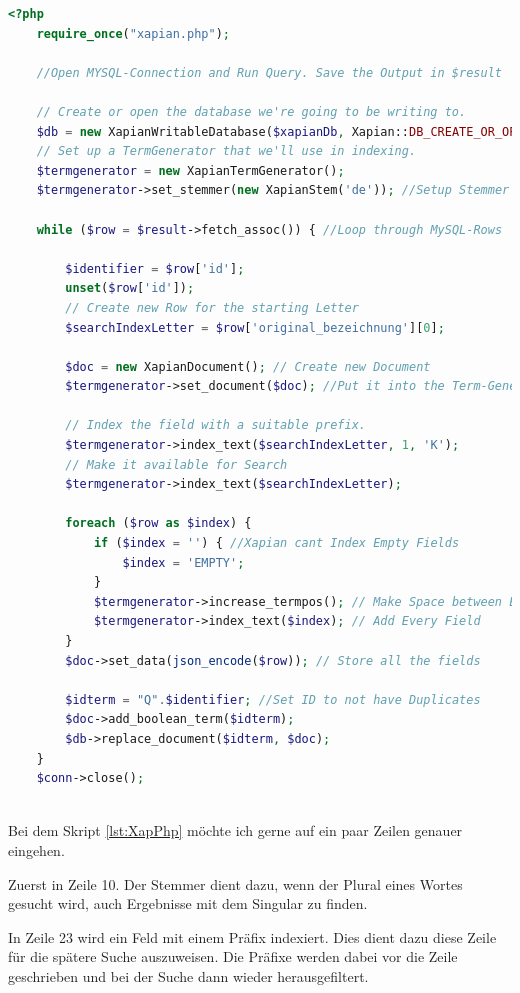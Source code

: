 \begin{lstlisting}[language=php, frame=single, label={lst:XapPhp}, 
	morekeywords={type,uninvertible,indexed,stored,field,multiValued, name}] 
	<?php
	require_once("xapian.php");
	
	//Open MYSQL-Connection and Run Query. Save the Output in $result
	
	// Create or open the database we're going to be writing to.
	$db = new XapianWritableDatabase($xapianDb, Xapian::DB_CREATE_OR_OPEN);
	// Set up a TermGenerator that we'll use in indexing.
	$termgenerator = new XapianTermGenerator();
	$termgenerator->set_stemmer(new XapianStem('de')); //Setup Stemmer
	
	while ($row = $result->fetch_assoc()) { //Loop through MySQL-Rows
	
		$identifier = $row['id'];
		unset($row['id']);
		// Create new Row for the starting Letter
		$searchIndexLetter = $row['original_bezeichnung'][0];

		$doc = new XapianDocument(); // Create new Document
		$termgenerator->set_document($doc); //Put it into the Term-Generator
	
		// Index the field with a suitable prefix.
		$termgenerator->index_text($searchIndexLetter, 1, 'K'); 
		// Make it available for Search
		$termgenerator->index_text($searchIndexLetter); 
	
		foreach ($row as $index) {
			if ($index = '') { //Xapian cant Index Empty Fields
				$index = 'EMPTY';
			}
			$termgenerator->increase_termpos(); // Make Space between Entries
			$termgenerator->index_text($index); // Add Every Field
		}
		$doc->set_data(json_encode($row)); // Store all the fields
	
		$idterm = "Q".$identifier; //Set ID to not have Duplicates
		$doc->add_boolean_term($idterm);
		$db->replace_document($idterm, $doc);
	}
	$conn->close();
	
  \end{lstlisting}

Bei dem Skript \ref{lst:XapPhp} möchte ich gerne auf ein paar Zeilen genauer eingehen. 

Zuerst in Zeile 10. Der Stemmer dient dazu, wenn der Plural eines Wortes gesucht wird, auch Ergebnisse mit dem Singular zu finden. 

In Zeile 23 wird ein Feld mit einem Präfix indexiert. Dies dient dazu diese Zeile für die spätere Suche auszuweisen. Die Präfixe werden dabei vor die Zeile geschrieben und bei der Suche dann wieder herausgefiltert. 

